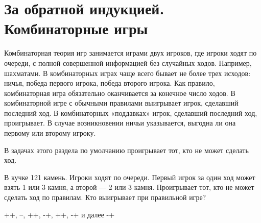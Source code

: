 




\section{За обратной индукцией. Комбинаторные игры}


Комбинаторная теория игр занимается играми двух игроков, где игроки ходят по очереди, с полной совершенной информацией без случайных ходов. Например, шахматами. В комбинаторных играх чаще всего бывает не более трех исходов: ничья, победа первого игрока, победа второго игрока. Как правило, комбинаторная игра обязательно оканчивается за конечное число ходов. В комбинаторной игре с обычными правилами выигрывает игрок, сделавший последний ход. В комбинаторных «поддавках» игрок, сделавший последний ход, проигрывает. В случае возникновении ничьи указывается, выгодна ли она первому или второму игроку.

В задачах этого раздела по умолчанию проигрывает тот, кто не может сделать ход.





\begin{problem}\par
В кучке 121 камень. Игроки ходят по очереди. Первый игрок за один ход может взять 1 или 3 камня, а второй — 2 или 3 камня. Проигрывает тот, кто не может сделать ход по правилам. Кто выигрывает при правильной игре?

\begin{sol}
 ++, --, ++, -+, ++, -+ и далее -+
\end{sol}
\end{problem}

